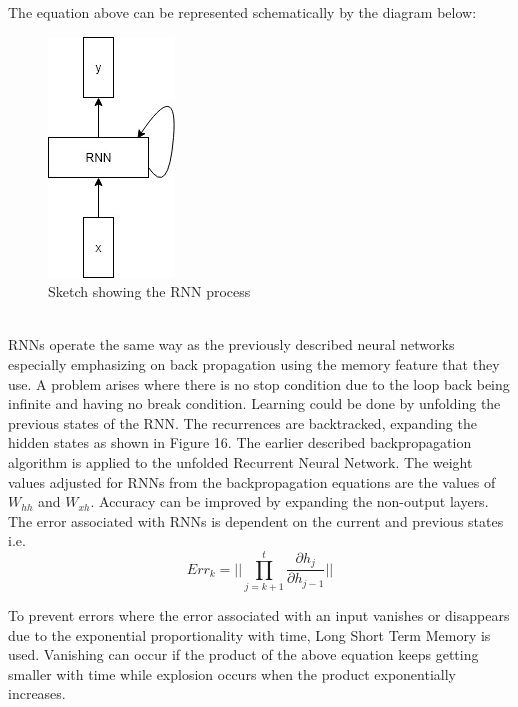 The equation above can be represented schematically by the diagram below:
\begin{figure}[h]
	\centering
	\includegraphics[scale=0.6]{15}
	\caption{Sketch showing the RNN process}
\end{figure}
\\
RNNs operate the same way as the previously described neural networks especially emphasizing on back propagation using the memory feature that they use. A problem arises where there is no stop condition due to the loop back being infinite and having no break condition. Learning could be done by unfolding the previous states of the RNN. The recurrences are backtracked, expanding the hidden states as shown in Figure 16. The earlier described backpropagation algorithm is applied to the unfolded Recurrent Neural Network. The weight values adjusted for RNNs from the backpropagation equations are the values of $W_{hh}$ and $W_{xh}$. Accuracy can be improved by expanding the non-output layers. The error associated with RNNs is dependent on the current and previous states i.e.
\begin{equation}
	Err_k = || \prod_{j=k+1}^{t} \frac{\partial h_j}{\partial h_{j-1}}||
\end{equation}

To prevent errors where the error associated with an input vanishes or disappears due to the exponential proportionality with time, Long Short Term Memory is used. Vanishing can occur if the product of the above equation keeps getting smaller with time while explosion occurs when the product exponentially increases.


